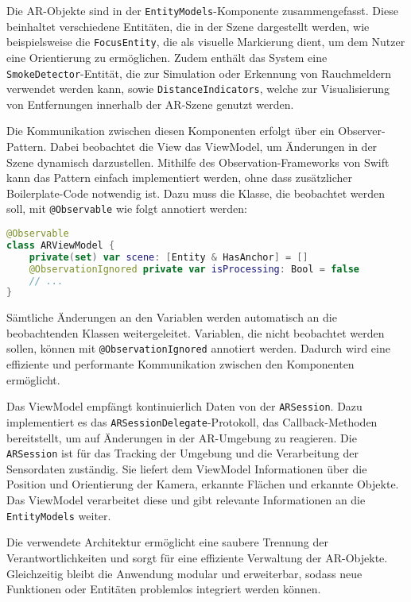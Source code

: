 Die AR-Objekte sind in der \texttt{EntityModels}-Komponente zusammengefasst. Diese beinhaltet verschiedene Entitäten, die in der Szene dargestellt werden, wie beispielsweise die \texttt{FocusEntity}, die als visuelle Markierung dient, um dem Nutzer eine Orientierung zu ermöglichen. Zudem enthält das System eine \texttt{SmokeDetector}-Entität, die zur Simulation oder Erkennung von Rauchmeldern verwendet werden kann, sowie \texttt{DistanceIndicators}, welche zur Visualisierung von Entfernungen innerhalb der AR-Szene genutzt werden.

Die Kommunikation zwischen diesen Komponenten erfolgt über ein Observer-Pattern. Dabei beobachtet die View das ViewModel, um Änderungen in der Szene dynamisch darzustellen. Mithilfe des Observation-Frameworks von Swift kann das Pattern einfach implementiert werden, ohne dass zusätzlicher Boilerplate-Code notwendig ist. Dazu muss die Klasse, die beobachtet werden soll, mit \texttt{@Observable} wie folgt annotiert werden:

\begin{lstlisting}[language=Swift]
@Observable
class ARViewModel {
    private(set) var scene: [Entity & HasAnchor] = []
    @ObservationIgnored private var isProcessing: Bool = false
    // ...
}
\end{lstlisting}

Sämtliche Änderungen an den Variablen werden automatisch an die beobachtenden Klassen weitergeleitet. Variablen, die nicht beobachtet werden sollen, können mit \texttt{@ObservationIgnored} annotiert werden. Dadurch wird eine effiziente und performante Kommunikation zwischen den Komponenten ermöglicht.

Das ViewModel empfängt kontinuierlich Daten von der \texttt{ARSession}. Dazu implementiert es das \texttt{ARSessionDelegate}-Protokoll, das Callback-Methoden bereitstellt, um auf Änderungen in der AR-Umgebung zu reagieren. Die \texttt{ARSession} ist für das Tracking der Umgebung und die Verarbeitung der Sensordaten zuständig. Sie liefert dem ViewModel Informationen über die Position und Orientierung der Kamera, erkannte Flächen und erkannte Objekte. Das ViewModel verarbeitet diese und gibt relevante Informationen an die \texttt{EntityModels} weiter. 

Die verwendete Architektur ermöglicht eine saubere Trennung der Verantwortlichkeiten und sorgt für eine effiziente Verwaltung der AR-Objekte. Gleichzeitig bleibt die Anwendung modular und erweiterbar, sodass neue Funktionen oder Entitäten problemlos integriert werden können.

